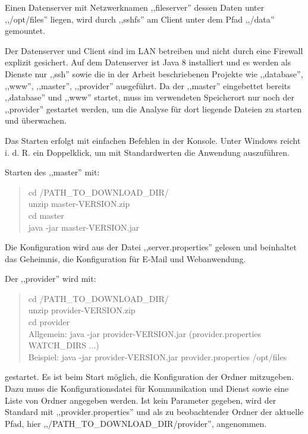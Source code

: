 \documentclass[oneside, ngerman, toc=bibliography,bibliography=totoc,listof=entryprefix, open=right,numbers=noenddot,fontsize=12pt]{scrbook}
\begin{document}
Einen Datenserver mit Netzwerknamen ,,fileserver'' dessen Daten unter ,,/opt/files'' liegen, wird durch ,,sshfs'' am Client unter dem Pfad ,,/data'' gemountet.

Der Datenserver und Client sind im LAN betreiben und nicht durch eine Firewall explizit gesichert. Auf dem Datenserver ist Java 8 installiert und es werden als Dienste nur ,,ssh'' sowie die in der Arbeit beschriebenen Projekte wie ,,database'', ,,www'', ,,master'', ,,provider'' ausgeführt. Da der ,,master'' eingebettet bereits ,,database'' und ,,www'' startet, muss im verwendeten Speicherort nur noch der ,,provider'' gestartet werden, um die Analyse für  dort liegende Dateien zu starten und überwachen.

Das Starten erfolgt mit einfachen Befehlen in der Konsole. Unter Windows reicht i. d. R. ein Doppelklick, um mit Standardwerten die Anwendung auszuführen. 

\bigskip

Starten des ,,master'' mit: 
\begin{quote}
    cd /PATH\_TO\_DOWNLOAD\_DIR/ \\
    unzip master-VERSION.zip \\
    cd master \\
    java -jar master-VERSION.jar 
\end{quote}

Die Konfiguration wird aus der Datei ,,server.properties'' gelesen und beinhaltet das Geheimnis, die Konfiguration für E-Mail und Webanwendung.

\bigskip

Der ,,provider'' wird mit:
\begin{quote}
    
    cd /PATH\_TO\_DOWNLOAD\_DIR/ \\
    unzip provider-VERSION.zip \\
    cd provider \\
    Allgemein: java -jar provider-VERSION.jar (provider.properties WATCH\_DIRS ...)\\
    Beispiel: java -jar provider-VERSION.jar provider.properties /opt/files
\end{quote}

gestartet. Es ist beim Start möglich, die Konfiguration der Ordner mitzugeben. Dazu muss die Konfigurationsdatei für Kommunikation und Dienst sowie eine Liste von Ordner angegeben werden. Ist kein Parameter gegeben, wird der Standard mit ,,provider.properties'' und als zu beobachtender Ordner der aktuelle Pfad, hier ,,/PATH\_TO\_DOWNLOAD\_DIR/provider'', angenommen.
\end{document}
